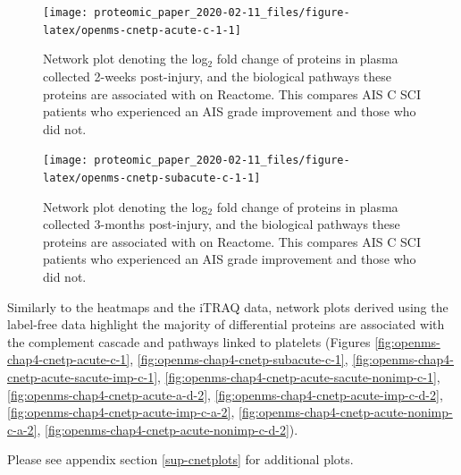 \documentclass[9pt,lineno]{elife}
\newcommand{\blandscape}{\begin{landscape}}
\newcommand{\elandscape}{\end{landscape}}
\begin{document}
\begin{landscape}
\begin{landscape}



\begin{figure}

{\centering \texttt{[image: proteomic\_paper\_2020-02-11\_files/figure-latex/openms-cnetp-acute-c-1-1]} 

}

\caption{Network plot denoting the log\(_2\) fold change of proteins in plasma collected 2-weeks post-injury, and the biological pathways these proteins are associated with on Reactome. This compares AIS C SCI patients who experienced an AIS grade improvement and those who did not.}\label{fig:openms-cnetp-acute-c-1}
\end{figure}

\elandscape
\blandscape



\begin{figure}

{\centering \texttt{[image: proteomic\_paper\_2020-02-11\_files/figure-latex/openms-cnetp-subacute-c-1-1]} 

}

\caption{Network plot denoting the log\(_2\) fold change of proteins in plasma collected 3-months post-injury, and the biological pathways these proteins are associated with on Reactome. This compares AIS C SCI patients who experienced an AIS grade improvement and those who did not.}\label{fig:openms-cnetp-subacute-c-1}
\end{figure}

\end{landscape}

\clearpage

Similarly to the heatmaps and the iTRAQ data, network plots derived using the label-free data highlight the majority of differential proteins are associated with the complement cascade and pathways linked to platelets (Figures \ref{fig:openms-chap4-cnetp-acute-c-1}, \ref{fig:openms-chap4-cnetp-subacute-c-1}, \ref{fig:openms-chap4-cnetp-acute-sacute-imp-c-1}, \ref{fig:openms-chap4-cnetp-acute-sacute-nonimp-c-1}, \ref{fig:openms-chap4-cnetp-acute-a-d-2}, \ref{fig:openms-chap4-cnetp-acute-imp-c-d-2}, \ref{fig:openms-chap4-cnetp-acute-imp-c-a-2}, \ref{fig:openms-chap4-cnetp-acute-nonimp-c-a-2}, \ref{fig:openms-chap4-cnetp-acute-nonimp-c-d-2}).

Please see appendix section \ref{sup-cnetplots} for additional plots.

\begin{landscape}




\end{landscape}
\end{landscape}
\end{document}
